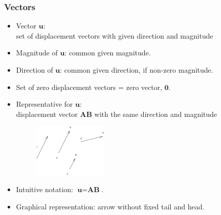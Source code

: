 \begin{frame}
 \frametitle{Vectors}

  \begin{itemize}
   \item Vector $\textbf{u}$: \\
      set of displacement vectors with given direction and magnitude

    \item  Magnitude of $\textbf{u}$: common given magnitude.

    \item Direction of $\textbf{u}$: common given direction, if non-zero magnitude.

    \item Set of zero displacement vectors = zero vector, $\textbf{0}$. \pause

    \item Representative for $\textbf{u}$: \\
      displacement vector $\textbf{AB}$ with the same direction and magnitude

\begin{figure}[h]
  \includegraphics[height=1in]{../images/ok-vector_representatives.eps}
  \label{fig:vector_representative}

\end{figure}

    \item Intuitive notation:  $\textbf{u}=\textbf{AB}$.

    \item Graphical representation: arrow without fixed tail and head.

  \end{itemize}
\end{frame}


